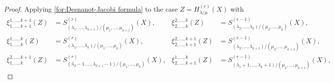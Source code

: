 \documentclass[12pt]{amsart}%
\theoremstyle{definition}
\begin{document}
\begin{proof}
Applying \eqref{for:Desnanot-Jacobi formula} 
to the case $Z=H^{(r)}_{\lambda/\mu}(X)
 $ with 
\begin{align*}
\xi^{1,\ldots,k+1}_{1,\ldots,k+1}(Z)
&=S^{(r)}_{(\lambda_1,\ldots,\lambda_{k+1})/(\mu_1,\ldots,\mu_{k+1})}(X),
&
\xi^{2,\ldots,k}_{2,\ldots,k}(Z)
&=S^{(r-1)}_{(\lambda_2,\ldots,\lambda_{k})/(\mu_2,\ldots,\mu_{k})}(X),\\
\xi^{1,\ldots,k}_{1,\ldots,k}(Z)
&=S^{(r)}_{(\lambda_1,\ldots,\lambda_{k})/(\mu_1,\ldots,\mu_{k})}(X),
&
\xi^{2,\ldots,k+1}_{2,\ldots,k+1}(Z)
&=S^{(r-1)}_{(\lambda_2,\ldots,\lambda_{k+1})/(\mu_2,\ldots,\mu_{k+1})}(X),\\
\xi^{2,\ldots,k+1}_{1,\ldots,k}(Z)
&=S^{(r)}_{(\lambda_2-1,\ldots,\lambda_{k+1}-1)/(\mu_1,\ldots,\mu_{k})}(X),
&
\xi^{1,\ldots,k}_{2,\ldots,k+1}(Z)
&=S^{(r-1)}_{(\lambda_1+1,\ldots,\lambda_{k}+1)/(\mu_2,\ldots,\mu_{k+1})}(X),
\end{align*}

\end{proof}
\end{document}

